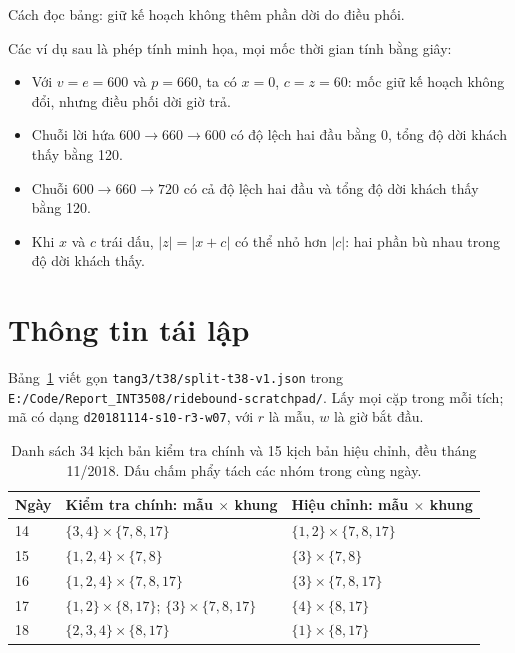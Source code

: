 Cách đọc bảng: giữ kế hoạch không thêm phần dời do điều phối.

Các ví dụ sau là phép tính minh họa, mọi mốc thời gian tính bằng giây:
\begin{itemize}[leftmargin=1.2cm,itemsep=0pt,topsep=2pt]
\item Với $v=e=600$ và $p=660$, ta có $x=0$, $c=z=60$: mốc giữ kế hoạch không đổi, nhưng điều phối dời giờ trả.
\item Chuỗi lời hứa $600\to660\to600$ có độ lệch hai đầu bằng 0, tổng độ dời khách thấy bằng 120.
\item Chuỗi $600\to660\to720$ có cả độ lệch hai đầu và tổng độ dời khách thấy bằng 120.
\item Khi $x$ và $c$ trái dấu, $|z|=|x+c|$ có thể nhỏ hơn $|c|$: hai phần bù nhau trong độ dời khách thấy.
\end{itemize}

\section{Thông tin tái lập}
\label{phuluc:C}
\setcounter{table}{0}

Bảng~\ref{bang:pl-danhsach} viết gọn \nolinkurl{tang3/t38/split-t38-v1.json} trong \nolinkurl{E:/Code/Report_INT3508/ridebound-scratchpad/}. Lấy mọi cặp trong mỗi tích; mã có dạng \nolinkurl{d20181114-s10-r3-w07}, với $r$ là mẫu, $w$ là giờ bắt đầu.

\begin{table}[htbp]
\centering
\caption{Danh sách 34 kịch bản kiểm tra chính và 15 kịch bản hiệu chỉnh, đều tháng 11/2018. Dấu chấm phẩy tách các nhóm trong cùng ngày.}
\label{bang:pl-danhsach}
\begin{tabular}{@{}p{1.5cm}p{7.0cm}p{6.5cm}@{}}
\toprule
\textbf{Ngày} & \textbf{Kiểm tra chính: mẫu $\times$ khung} & \textbf{Hiệu chỉnh: mẫu $\times$ khung} \\
\midrule
14 & $\{3,4\}\times\{7,8,17\}$ & $\{1,2\}\times\{7,8,17\}$ \\
15 & $\{1,2,4\}\times\{7,8\}$ & $\{3\}\times\{7,8\}$ \\
16 & $\{1,2,4\}\times\{7,8,17\}$ & $\{3\}\times\{7,8,17\}$ \\
17 & $\{1,2\}\times\{8,17\}$; $\{3\}\times\{7,8,17\}$ & $\{4\}\times\{8,17\}$ \\
18 & $\{2,3,4\}\times\{8,17\}$ & $\{1\}\times\{8,17\}$ \\
\bottomrule
\end{tabular}
\end{table}


